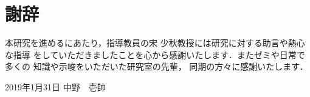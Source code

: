 \documentclass[12pt]{optlab-bachelor}
\def\氏名{中野　壱帥}
\begin{document}
%


\chapter*{謝辞}
本研究を進めるにあたり，指導教員の宋 少秋教授には研究に対する助言や熱心な指導
をしていただきましたことを心から感謝いたします．またゼミや日常で多くの
知識や示唆をいただいた研究室の先輩，
同期の方々に感謝いたします．

\begin{flushright}
  2019年1月31日 \氏名
\end{flushright}
\endmatter %
\end{document}
